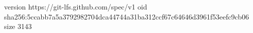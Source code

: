 version https://git-lfs.github.com/spec/v1
oid sha256:5ccabb7a5a3792982704dca44744a31ba312ccf67c64646d3961f53eefc9cb06
size 3143
